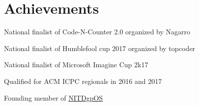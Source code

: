 \documentclass[letterpaper]{deedy-resume} %
\begin{document}
\begin{minipage}[t]{0.66\textwidth}
\sectionspace


\section{Achievements}

\sectionspace

\begin{tightitemize}
\item National finalist of Code-N-Counter 2.0 organized by Nagarro\\
\item National finalist of Humblefool cup 2017 organized by topcoder\\
\item National finalist of Microsoft Imagine Cup 2k17\\
\item Qualified for ACM ICPC regionals in 2016 and 2017\\
\item Founding member of \href{https://github.com/NITDgpOS}{NITDgpOS}
\end{tightitemize}



\end{minipage} %
\end{document}
